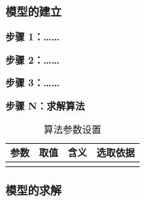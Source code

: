 %
%
\subsubsection{模型的建立}



\textbf{步骤 1：……}

\textbf{步骤 2：……}

\textbf{步骤 3：……}

\textbf{步骤 N：求解算法}

\begin{table}[htbp]
  \centering
  \caption{算法参数设置}
  \begin{tabularx}{\linewidth}{llXX}
    \toprule
    参数 & 取值 & 含义 & 选取依据 \\
    \midrule
     &  &  &  \\
    \bottomrule
  \end{tabularx}
\end{table}


\subsubsection{模型的求解}

